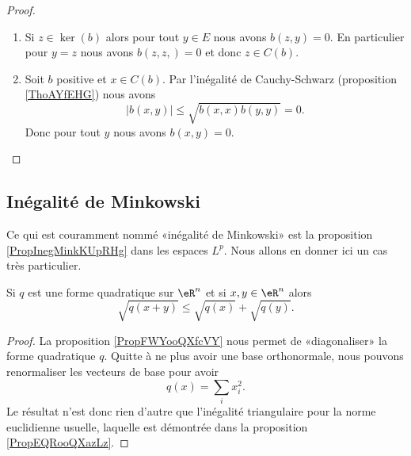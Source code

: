 \begin{proof}
    \begin{enumerate}
        \item
            Si \( z\in\ker(b)\) alors pour tout \( y\in E\) nous avons \( b(z,y)=0\). En particulier pour \( y=z\) nous avons \( b(z,z,)=0\) et donc \( z\in C(b)\).
        \item
            Soit \( b\) positive et \( x\in C(b)\). Par l'inégalité de Cauchy-Schwarz (proposition \ref{ThoAYfEHG}) nous avons
            \begin{equation}
                | b(x,y) |\leq \sqrt{   b(x,x)b(y,y) }=0.
            \end{equation}
            Donc pour tout \( y\) nous avons \( b(x,y)=0\).
    \end{enumerate}
\end{proof}

\subsection{Inégalité de Minkowski}

Ce qui est couramment nommé «inégalité de Minkowski» est la proposition \ref{PropInegMinkKUpRHg} dans les espaces \( L^p\). Nous allons en donner ici un cas très particulier.

\begin{proposition} \label{PropACHooLtsMUL}
    Si \( q\) est une forme quadratique sur \( \eR^n\) et si \( x,y\in \eR^n\) alors
    \begin{equation}
        \sqrt{q(x+y)}\leq\sqrt{q(x)}+\sqrt{q(y)}.
    \end{equation}
\end{proposition}

\begin{proof}
    La proposition \ref{PropFWYooQXfcVY} nous permet de «diagonaliser» la forme quadratique \( q\). Quitte à ne plus avoir une base orthonormale, nous pouvons renormaliser les vecteurs de base pour avoir
    \begin{equation}
        q(x)=\sum_ix_i^2.
    \end{equation}
    Le résultat n'est donc rien d'autre que l'inégalité triangulaire pour la norme euclidienne usuelle, laquelle est démontrée dans la proposition \ref{PropEQRooQXazLz}.
\end{proof}

